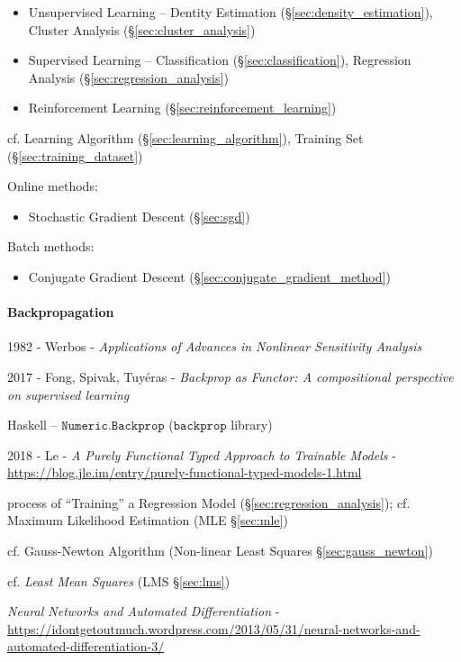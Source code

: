\begin{itemize}
  \item Unsupervised Learning -- Dentity Estimation
    (\S\ref{sec:density_estimation}), Cluster Analysis
    (\S\ref{sec:cluster_analysis})
  \item Supervised Learning -- Classification (\S\ref{sec:classification}),
    Regression Analysis (\S\ref{sec:regression_analysis})
  \item Reinforcement Learning (\S\ref{sec:reinforcement_learning})
\end{itemize}

\fist cf. Learning Algorithm (\S\ref{sec:learning_algorithm}),
Training Set (\S\ref{sec:training_dataset})

Online methods:
\begin{itemize}
  \item Stochastic Gradient Descent (\S\ref{sec:sgd})
\end{itemize}

Batch methods:
\begin{itemize}
  \item Conjugate Gradient Descent (\S\ref{sec:conjugate_gradient_method})
\end{itemize}



\paragraph{Backpropagation}\label{sec:backpropagation}\hfill

1982 - Werbos -
\emph{Applications of Advances in Nonlinear Sensitivity Analysis}

2017 - Fong, Spivak, Tuy\'eras - \emph{Backprop as Functor: A compositional
  perspective on supervised learning}

Haskell -- $\mathtt{Numeric.Backprop}$ ($\mathtt{backprop}$ library)

2018 - Le - \emph{A Purely Functional Typed Approach to Trainable Models} -
\url{https://blog.jle.im/entry/purely-functional-typed-models-1.html}

process of ``Training'' a Regression Model (\S\ref{sec:regression_analysis});
cf. Maximum Likelihood Estimation (MLE \S\ref{sec:mle})

cf. Gauss-Newton Algorithm (Non-linear Least Squares \S\ref{sec:gauss_newton})

cf. \emph{Least Mean Squares} (LMS \S\ref{sec:lms})

\emph{Neural Networks and Automated Differentiation} -
\url{https://idontgetoutmuch.wordpress.com/2013/05/31/neural-networks-and-automated-differentiation-3/}

